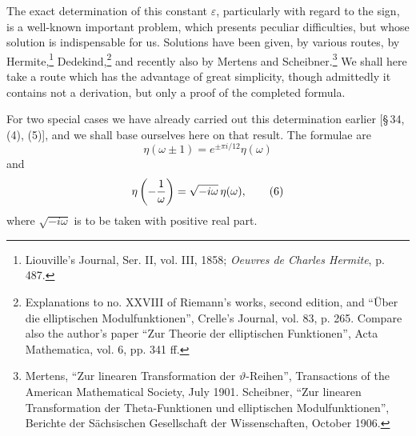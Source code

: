\documentclass[11pt]{article}
\begin{document}
The exact determination of this constant $\varepsilon$, particularly with regard to the sign, is a well-known important problem, which presents peculiar difficulties, but whose solution is indispensable for us. Solutions have been given, by various routes, by Hermite,\footnote{Liouville's Journal, Ser. II, vol. III, 1858; \emph{Oeuvres de Charles Hermite}, p. 487.} Dedekind,\footnote{Explanations to no. XXVIII of Riemann's works, second edition, and ``Über die elliptischen Modulfunktionen'', Crelle's Journal, vol. 83, p. 265. Compare also the author's paper ``Zur Theorie der elliptischen Funktionen'', Acta Mathematica, vol. 6, pp. 341 ff.} and recently also by Mertens and Scheibner.\footnote{Mertens, ``Zur linearen Transformation der $\vartheta$-Reihen'', Transactions of the American Mathematical Society, July 1901. Scheibner, ``Zur linearen Transformation der Theta-Funktionen und elliptischen Modulfunktionen'', Berichte der Sächsischen Gesellschaft der Wissenschaften, October 1906.} We shall here take a route which has the advantage of great simplicity, though admittedly it contains not a derivation, but only a proof of the completed formula.

For two special cases we have already carried out this determination earlier [\S\,34, (4), (5)], and we shall base ourselves here on that result. The formulae are
\begin{equation}
\eta(\omega\pm1)=e^{\pm\pi i/12}\eta(\omega)
\tag{5}
\end{equation}
and
\begin{equation}
\eta\left(-{1\over\omega}\right)=\sqrt{-i\omega}\,\eta(\omega),
\tag{6}
\end{equation}
where $\sqrt{-i\omega}$ is to be taken with positive real part.
\end{document}
